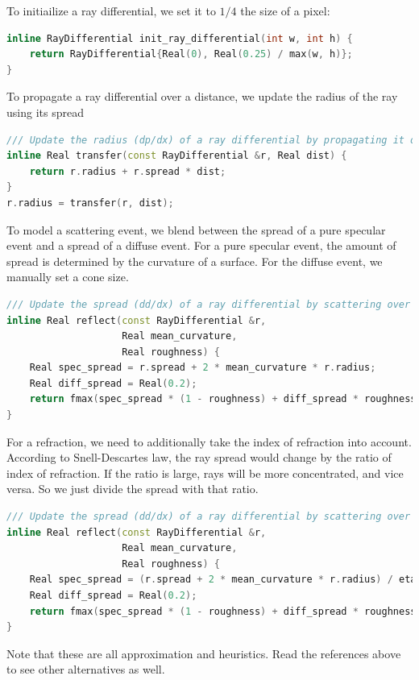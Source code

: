 \documentclass{article}
\begin{document}
To initiailize a ray differential, we set it to $1/4$ the size of a pixel:
\begin{lstlisting}[language=c++]
inline RayDifferential init_ray_differential(int w, int h) {
    return RayDifferential{Real(0), Real(0.25) / max(w, h)};
}
\end{lstlisting}

To propagate a ray differential over a distance, we update the radius of the ray using its spread
\begin{lstlisting}[language=c++]
/// Update the radius (dp/dx) of a ray differential by propagating it over a distance.
inline Real transfer(const RayDifferential &r, Real dist) {
    return r.radius + r.spread * dist;
}
r.radius = transfer(r, dist);
\end{lstlisting}

To model a scattering event, we blend between the spread of a pure specular event and a spread of a diffuse event.
For a pure specular event, the amount of spread is determined by the curvature of a surface.
For the diffuse event, we manually set a cone size.
\begin{lstlisting}[language=c++]
/// Update the spread (dd/dx) of a ray differential by scattering over a reflective surface.
inline Real reflect(const RayDifferential &r,
                    Real mean_curvature,
                    Real roughness) {
    Real spec_spread = r.spread + 2 * mean_curvature * r.radius;
    Real diff_spread = Real(0.2);
    return fmax(spec_spread * (1 - roughness) + diff_spread * roughness, Real(0));
}
\end{lstlisting}

For a refraction, we need to additionally take the index of refraction into account. According to Snell-Descartes law, the ray spread would change by the ratio of index of refraction. If the ratio is large, rays will be more concentrated, and vice versa. So we just divide the spread with that ratio.
\begin{lstlisting}[language=c++]
/// Update the spread (dd/dx) of a ray differential by scattering over a reflective surface.
inline Real reflect(const RayDifferential &r,
                    Real mean_curvature,
                    Real roughness) {
    Real spec_spread = (r.spread + 2 * mean_curvature * r.radius) / eta;
    Real diff_spread = Real(0.2);
    return fmax(spec_spread * (1 - roughness) + diff_spread * roughness, Real(0));
}
\end{lstlisting}
Note that these are all approximation and heuristics. Read the references above to see other alternatives as well.
\end{document}
